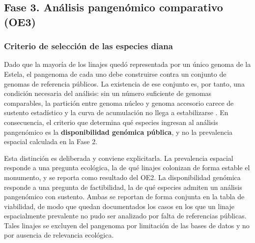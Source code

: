 

\subsection{Fase 3. Análisis pangenómico comparativo (OE3)}

\subsubsection{Criterio de selección de las especies diana}

Dado que la mayoría de los linajes quedó representada por un único genoma de la Estela, el pangenoma de cada uno debe construirse contra un conjunto de genomas de referencia públicos. La existencia de ese conjunto es, por tanto, una condición necesaria del análisis: sin un número suficiente de genomas comparables, la partición entre genoma núcleo y genoma accesorio carece de sustento estadístico y la curva de acumulación no llega a estabilizarse \cite{tettelin2005}. En consecuencia, el criterio que determina qué especies ingresan al análisis pangenómico es la \textbf{disponibilidad genómica pública}, y no la prevalencia espacial calculada en la Fase 2.

Esta distinción es deliberada y conviene explicitarla. La prevalencia espacial responde a una pregunta ecológica, la de qué linajes colonizan de forma estable el monumento, y se reporta como resultado del OE2. La disponibilidad genómica responde a una pregunta de factibilidad, la de qué especies admiten un análisis pangenómico con sustento. Ambas se reportan de forma conjunta en la tabla de viabilidad, de modo que quedan documentados los casos en los que un linaje espacialmente prevalente no pudo ser analizado por falta de referencias públicas. Tales linajes se excluyen del pangenoma por limitación de las bases de datos y no por ausencia de relevancia ecológica.

